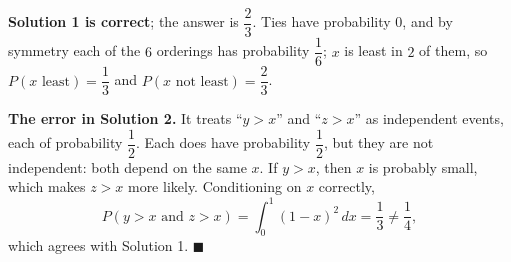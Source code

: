 \textbf{Solution 1 is correct}; the answer is $\dfrac{2}{3}$. Ties have probability $0$, and by symmetry each of the $6$ orderings has probability $\dfrac{1}{6}$; $x$ is least in $2$ of them, so $P(x\text{ least})=\dfrac{1}{3}$ and $P(x\text{ not least})=\boxed{\dfrac{2}{3}}$.

\textbf{The error in Solution 2.} It treats ``$y>x$'' and ``$z>x$'' as independent events, each of probability $\dfrac{1}{2}$. Each does have probability $\dfrac{1}{2}$, but they are not independent: both depend on the same $x$. If $y>x$, then $x$ is probably small, which makes $z>x$ more likely. Conditioning on $x$ correctly,
\[
P(y>x\text{ and }z>x)=\int_0^1(1-x)^2\,dx=\dfrac{1}{3}\ne\dfrac{1}{4} ,
\]
which agrees with Solution 1. $\blacksquare$

